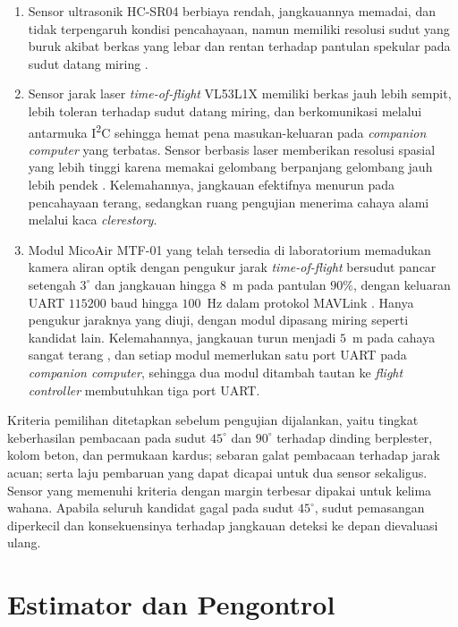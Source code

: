 \documentclass[12pt,a4paper]{report}
\begin{document}
\begin{enumerate}
    \item Sensor ultrasonik HC-SR04 berbiaya rendah, jangkauannya memadai, dan tidak terpengaruh kondisi pencahayaan, namun memiliki resolusi sudut yang buruk akibat berkas yang lebar dan rentan terhadap pantulan spekular pada sudut datang miring \cite{pedroSenseAvoidSystem2025}.
    \item Sensor jarak laser \textit{time-of-flight} VL53L1X memiliki berkas jauh lebih sempit, lebih toleran terhadap sudut datang miring, dan berkomunikasi melalui antarmuka I\textsuperscript{2}C sehingga hemat pena masukan-keluaran pada \textit{companion computer} yang terbatas. Sensor berbasis laser memberikan resolusi spasial yang lebih tinggi karena memakai gelombang berpanjang gelombang jauh lebih pendek \cite{pedroSenseAvoidSystem2025}. Kelemahannya, jangkauan efektifnya menurun pada pencahayaan terang, sedangkan ruang pengujian menerima cahaya alami melalui kaca \textit{clerestory}.
    \item Modul MicoAir MTF-01 yang telah tersedia di laboratorium memadukan kamera aliran optik dengan pengukur jarak \textit{time-of-flight} bersudut pancar setengah $3^\circ$ dan jangkauan hingga $8$~m pada pantulan $90\%$, dengan keluaran UART $115200$ baud hingga $100$~Hz dalam protokol MAVLink \cite{micoairMTF01}. Hanya pengukur jaraknya yang diuji, dengan modul dipasang miring seperti kandidat lain. Kelemahannya, jangkauan turun menjadi $5$~m pada cahaya sangat terang \cite{micoairMTF01}, dan setiap modul memerlukan satu port UART pada \textit{companion computer}, sehingga dua modul ditambah tautan ke \textit{flight controller} membutuhkan tiga port UART.
\end{enumerate}

Kriteria pemilihan ditetapkan sebelum pengujian dijalankan, yaitu tingkat keberhasilan pembacaan pada sudut $45^\circ$ dan $90^\circ$ terhadap dinding berplester, kolom beton, dan permukaan kardus; sebaran galat pembacaan terhadap jarak acuan; serta laju pembaruan yang dapat dicapai untuk dua sensor sekaligus. Sensor yang memenuhi kriteria dengan margin terbesar dipakai untuk kelima wahana. Apabila seluruh kandidat gagal pada sudut $45^\circ$, sudut pemasangan diperkecil dan konsekuensinya terhadap jangkauan deteksi ke depan dievaluasi ulang.

\section{Estimator dan Pengontrol}
\end{document}

